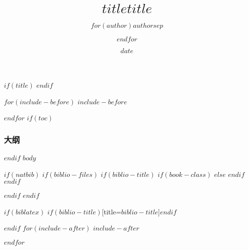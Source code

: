 \documentclass[$if(fontsize)$$fontsize$,$endif$$if(handout)$handout,$endif$$if(beamer)$ignorenonframetext,$endif$]{$documentclass$}
\title[$shorttitle$]{$title$}
\title{$title$}
\author{$for(author)$$author$$sep$ \and $endfor$}
\date{$date$}
\institute[统计之都]{
统计之都\\
\hurl{http://cos.name}
}
\begin{document}
$if(title)$
  \frame{\titlepage}
$endif$
 
$for(include-before)$
$include-before$
 
$endfor$
$if(toc)$
\begin{frame}\frametitle{大纲}
\tableofcontents[hideallsubsections]
\end{frame}
 
$endif$
$body$
 
$if(natbib)$
  $if(biblio-files)$
    $if(biblio-title)$
      $if(book-class)$
        \renewcommand\bibname{$biblio-title$}
      $else$
        \renewcommand\refname{$biblio-title$}
      $endif$
    $endif$
      
 
  $endif$
$endif$

$if(biblatex)$
  \printbibliography$if(biblio-title)$[title=$biblio-title$]$endif$
 
$endif$
$for(include-after)$
  $include-after$
 
$endfor$
\end{document}
